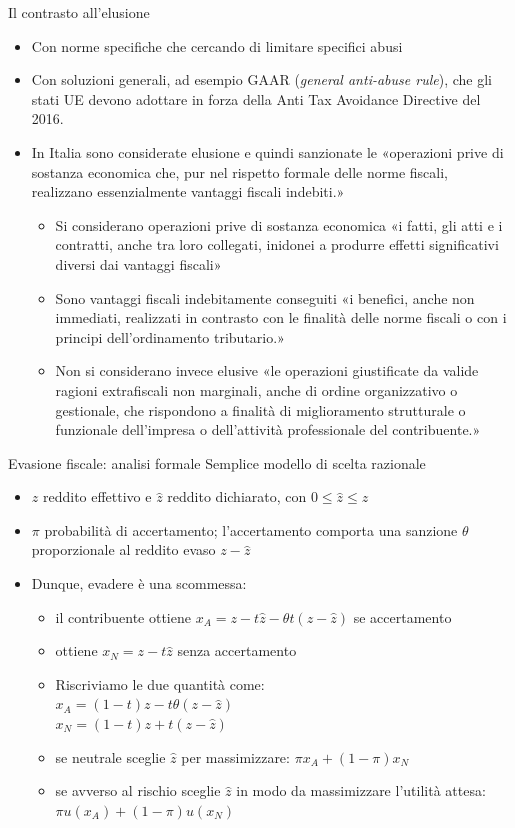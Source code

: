 \documentclass[11pt]{beamer}
\begin{document}
\begin{frame}{Il contrasto all'elusione}
\begin{itemize}
\item Con norme specifiche che cercando di limitare specifici abusi
\item Con soluzioni generali, ad esempio GAAR (\emph{general anti-abuse rule}), che gli
stati UE devono adottare in forza della Anti Tax Avoidance Directive
del 2016.
\item In Italia sono considerate elusione e quindi sanzionate le «operazioni prive
di sostanza economica che, pur nel rispetto formale delle norme fiscali,
realizzano essenzialmente vantaggi fiscali indebiti.»
\begin{itemize}
\item Si considerano \alert{operazioni prive di sostanza economica} «i fatti, gli atti
e i contratti, anche tra loro collegati, inidonei a produrre effetti
significativi diversi dai vantaggi fiscali»
\item Sono \alert{vantaggi fiscali indebitamente conseguiti} «i benefici, anche non
immediati, realizzati in contrasto con le finalità delle norme fiscali o
con i principi dell'ordinamento tributario.»
\item Non si considerano invece elusive «le operazioni giustificate da valide
ragioni extrafiscali non marginali, anche di ordine organizzativo o
gestionale, che rispondono a finalità di miglioramento strutturale o
funzionale dell'impresa o dell'attività professionale del contribuente.»
\end{itemize}
\end{itemize}
\end{frame}
\begin{frame}{Evasione fiscale: analisi formale}
Semplice modello di scelta razionale
\begin{itemize}
\item $z$ reddito effettivo e $\hat{z}$ reddito dichiarato, con $0\le\hat{z}\le z$
\item $\pi$ probabilità di accertamento; l'accertamento comporta una sanzione
$\theta$ proporzionale al reddito evaso $z-\hat{z}$
\item Dunque, evadere è una scommessa:
\begin{itemize}
\item il contribuente ottiene $x_A=z-t\hat{z}-\theta t(z-\hat z)$ se accertamento
\item ottiene $x_N=z-t\hat{z}$ senza accertamento
\item Riscriviamo le due quantità come:\\[0pt]
$x_A=(1-t)z-t\theta(z-\hat z)$ \\[0pt]
$x_N=(1-t)z+t(z-\hat z)$
\item se neutrale sceglie $\hat z$ per massimizzare: $\pi x_A + (1-\pi) x_N$
\item se avverso al rischio sceglie $\hat z$ in modo da massimizzare l'utilità attesa: $\pi
    u(x_A)+(1-\pi)u(x_N)$
\end{itemize}
\end{itemize}
\end{frame}
\end{document}
